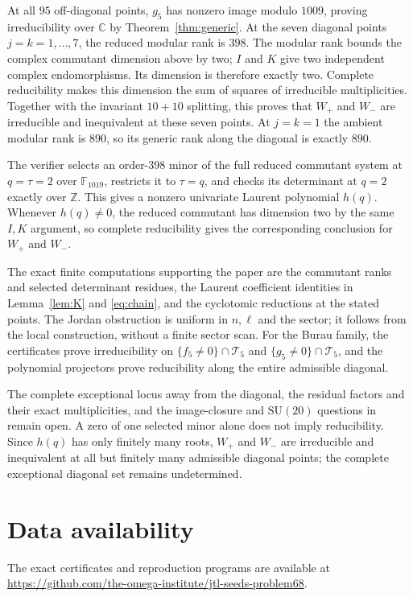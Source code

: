 \documentclass[11pt,a4paper]{article}
\newcommand{\C}{\mathbb C}
\newcommand{\Z}{\mathbb Z}
\newcommand{\F}{\mathbb F}
\newcommand{\Tcal}{\mathcal T}
\begin{document}
At all $95$ off-diagonal points, $g_5$ has nonzero image modulo
$1009$, proving irreducibility over $\C$ by
Theorem~\ref{thm:generic}. At the seven diagonal points
$j=k=1,\ldots,7$, the reduced modular rank is $398$.
The modular rank bounds the complex commutant dimension above by two;
$I$ and $K$ give two independent complex endomorphisms.
Its dimension is therefore exactly two. Complete reducibility makes
this dimension the sum of squares of irreducible multiplicities.
Together with the invariant $10+10$ splitting, this proves that
$W_+$ and $W_-$ are irreducible and inequivalent at these seven points.
At $j=k=1$ the ambient modular rank is $890$, so its generic rank
along the diagonal is exactly $890$.

The verifier selects an order-$398$ minor of the full reduced commutant
system at $q=\tau=2$ over $\F_{1019}$, restricts it to $\tau=q$, and
checks its determinant at $q=2$ exactly over $\Z$. This gives a nonzero
univariate Laurent polynomial $h(q)$. Whenever $h(q)\ne0$, the reduced
commutant has dimension two by the same $I,K$ argument, so complete
reducibility gives the corresponding conclusion for $W_+$ and $W_-.$

The exact finite computations supporting the paper are the commutant
ranks and selected determinant residues, the Laurent coefficient
identities in Lemma~\ref{lem:K} and \eqref{eq:chain}, and the
cyclotomic reductions at the stated points. The Jordan obstruction
is uniform in $n,\ell$ and the sector; it follows from the local
construction, without a finite sector scan. For the Burau family,
the certificates prove irreducibility on
$\{f_5\ne0\}\cap\Tcal_5$ and $\{g_5\ne0\}\cap\Tcal_5$,
and the polynomial projectors prove reducibility along the entire
admissible diagonal.

The complete exceptional locus away from the diagonal, the residual
factors and their exact multiplicities, and the image-closure and
$\mathrm{SU}(20)$ questions in \cite[Problem~6.8]{Negami} remain open.
A zero of one selected minor alone does not imply reducibility. Since
$h(q)$ has only finitely many roots, $W_+$ and $W_-$ are irreducible
and inequivalent at all but finitely many admissible diagonal points;
the complete exceptional diagonal set remains undetermined.

\section*{Data availability}

The exact certificates and reproduction programs are available at
\url{https://github.com/the-omega-institute/jtl-seeds-problem68}.
\end{document}
